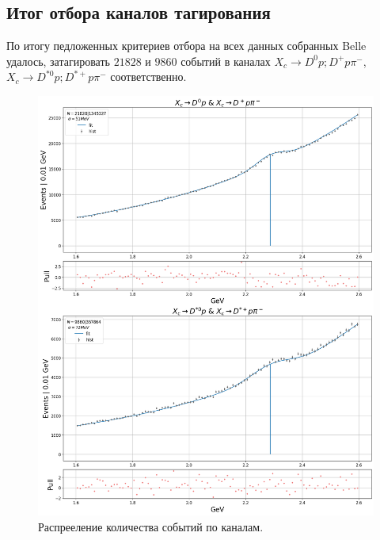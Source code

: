\subsection{Итог отбора каналов тагирования}

По итогу педложенных критериев отбора на всех данных собранных Belle удалось, затагировать 
$21828$ и $9860$ событий в каналах $X_c \to D^0 p; D^+ p \pi^-$,  $X_c \to D^{*0} p; D^{*+} p \pi^-$ 
соответственно.

\begin{figure}[H]
    \centering
    \includegraphics[width=1\linewidth]{img/tag_sum.png}
    \caption{Распрееление количества событий по каналам.}
\end{figure}
